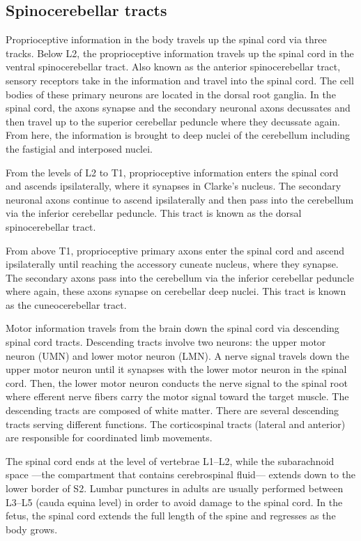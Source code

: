 \hypertarget{spinocerebellar-tracts}{%
\subsection{Spinocerebellar tracts}\label{spinocerebellar-tracts}}

Proprioceptive information in the body travels up the spinal cord via three tracks. Below L2, the proprioceptive information travels up the spinal cord in the ventral spinocerebellar tract. Also known as the anterior spinocerebellar tract, sensory receptors take in the information and travel into the spinal cord. The cell bodies of these primary neurons are located in the dorsal root ganglia. In the spinal cord, the axons synapse and the secondary neuronal axons decussates and then travel up to the superior cerebellar peduncle where they decussate again. From here, the information is brought to deep nuclei of the cerebellum including the fastigial and interposed nuclei.

From the levels of L2 to T1, proprioceptive information enters the spinal cord and ascends ipsilaterally, where it synapses in Clarke's nucleus. The secondary neuronal axons continue to ascend ipsilaterally and then pass into the cerebellum via the inferior cerebellar peduncle. This tract is known as the dorsal spinocerebellar tract.

From above T1, proprioceptive primary axons enter the spinal cord and ascend ipsilaterally until reaching the accessory cuneate nucleus, where they synapse. The secondary axons pass into the cerebellum via the inferior cerebellar peduncle where again, these axons synapse on cerebellar deep nuclei. This tract is known as the cuneocerebellar tract.

Motor information travels from the brain down the spinal cord via descending spinal cord tracts. Descending tracts involve two neurons: the upper motor neuron (UMN) and lower motor neuron (LMN). A nerve signal travels down the upper motor neuron until it synapses with the lower motor neuron in the spinal cord. Then, the lower motor neuron conducts the nerve signal to the spinal root where efferent nerve fibers carry the motor signal toward the target muscle. The descending tracts are composed of white matter. There are several descending tracts serving different functions. The corticospinal tracts (lateral and anterior) are responsible for coordinated limb movements.

The spinal cord ends at the level of vertebrae L1--L2, while the subarachnoid space ---the compartment that contains cerebrospinal fluid--- extends down to the lower border of S2. Lumbar punctures in adults are usually performed between L3--L5 (cauda equina level) in order to avoid damage to the spinal cord. In the fetus, the spinal cord extends the full length of the spine and regresses as the body grows.

